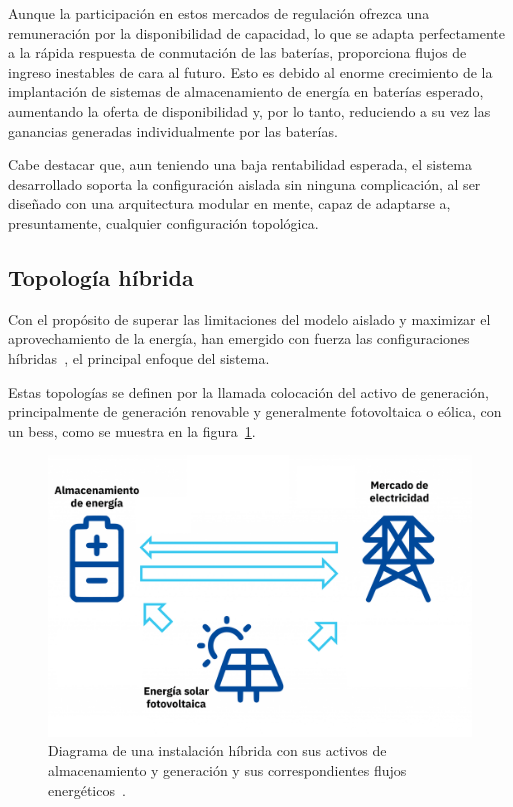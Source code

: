 Aunque la participación en estos mercados de regulación ofrezca una remuneración por la disponibilidad de capacidad, lo que se adapta perfectamente a la rápida respuesta de conmutación de las baterías, proporciona flujos de ingreso inestables de cara al futuro. Esto es debido al enorme crecimiento de la implantación de sistemas de almacenamiento de energía en baterías esperado, aumentando la oferta de disponibilidad y, por lo tanto, reduciendo a su vez las ganancias generadas individualmente por las baterías.

Cabe destacar que, aun teniendo una baja rentabilidad esperada, el sistema desarrollado soporta la configuración aislada sin ninguna complicación, al ser diseñado con una arquitectura modular en mente, capaz de adaptarse a, presuntamente, cualquier configuración topológica.

\subsection{Topología híbrida}%
\label{makereference3.1.2}

Con el propósito de superar las limitaciones del modelo aislado y maximizar el aprovechamiento de la energía, han emergido con fuerza las configuraciones híbridas~\cite{bresciani2025hybridization}, el principal enfoque del sistema.

Estas topologías se definen por la llamada colocación del activo de generación, principalmente de generación renovable y generalmente fotovoltaica o eólica, con un \gls{bess}, como se muestra en la figura~\ref{fig:topologia-hibrida}.

\begin{figure}
  \centering
  \includegraphics[width=0.5\linewidth]{figures/topologia-hibrida.png}
  \caption[Diagrama de una instalación híbrida.]{Diagrama de una instalación híbrida con sus activos de almacenamiento y generación y sus correspondientes flujos energéticos~\cite{aleasoft2025la}.}%
  \label{fig:topologia-hibrida}
\end{figure}

